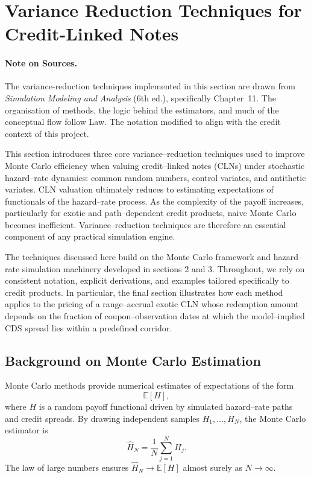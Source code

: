 \section{Variance Reduction Techniques for Credit-Linked Notes}

\paragraph{Note on Sources.}
The variance-reduction techniques implemented in this section are drawn from 
\cite{lawKelton2015} \textit{Simulation Modeling and Analysis} (6th ed.), 
specifically Chapter~11.  
The organisation of methods, the logic behind the estimators, 
and much of the conceptual flow follow Law. The notation modified to align with the credit context of this project.

This section introduces three core variance--reduction techniques used to
improve Monte Carlo efficiency when valuing credit--linked notes (CLNs) under
stochastic hazard--rate dynamics: common random numbers, control variates, and
antithetic variates. CLN valuation ultimately reduces to estimating expectations
of functionals of the hazard--rate process. As the complexity of the payoff
increases, particularly for exotic and path--dependent credit products, naive
Monte Carlo becomes inefficient. Variance--reduction techniques are therefore an
essential component of any practical simulation engine.

The techniques discussed here build on the Monte Carlo framework and
hazard--rate simulation machinery developed in sections 2 and 3. Throughout, we
rely on consistent notation, explicit derivations, and examples tailored
specifically to credit products. In particular, the final section illustrates how
each method applies to the pricing of a range--accrual exotic CLN whose
redemption amount depends on the fraction of coupon--observation dates at which
the model--implied CDS spread lies within a predefined corridor.

\subsection{Background on Monte Carlo Estimation}

Monte Carlo methods provide numerical estimates of expectations of the form
\[
\mathbb{E}[H],
\]
where $H$ is a random payoff functional driven by simulated hazard--rate paths
and credit spreads. By drawing independent samples $H_1,\dots,H_N$, the Monte
Carlo estimator is
\[
\hat{H}_N = \frac{1}{N}\sum_{j=1}^N H_j.
\]
The law of large numbers ensures $\hat{H}_N \to \mathbb{E}[H]$ almost surely as
$N\to\infty$.

